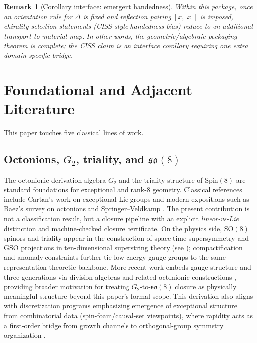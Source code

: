 \documentclass[11pt]{amsart}
\newtheorem{remark}[theorem]{Remark}
\begin{document}
\begin{remark}[Corollary interface: emergent handedness]
Within this package, once an orientation rule for \(\Delta\) is fixed and reflection pairing \([x,|x|]\) is imposed, chirality selection statements (CISS-style handedness bias) reduce to an additional transport-to-material map. In other words, the geometric/algebraic packaging theorem is complete; the CISS claim is an interface corollary requiring one extra domain-specific bridge.
\end{remark}

\section{Foundational and Adjacent Literature}

This paper touches five classical lines of work.

\subsection*{Octonions, \texorpdfstring{$G_2$}{G2}, triality, and \texorpdfstring{$\mathfrak{so}(8)$}{so(8)}}
The octonionic derivation algebra $G_2$ and the triality structure of $\mathrm{Spin}(8)$ are standard foundations for exceptional and rank-8 geometry. Classical references include Cartan's work on exceptional Lie groups and modern expositions such as Baez's survey on octonions \cite{baez2002} and Springer--Veldkamp \cite{springer2000}. The present contribution is not a classification result, but a closure pipeline with an explicit \emph{linear-vs-Lie} distinction and machine-checked closure certificate.
On the physics side, \(\mathrm{SO}(8)\) spinors and triality appear in the construction of space-time supersymmetry and GSO projections in ten-dimensional superstring theory (see \cite{green1987,polchinski1998}); compactification and anomaly constraints further tie low-energy gauge groups to the same representation-theoretic backbone. More recent work embeds gauge structure and three generations via division algebras and related octonionic constructions \cite{furey2018,borsten2014}, providing broader motivation for treating \(G_2\)-to-\(\mathfrak{so}(8)\) closure as physically meaningful structure beyond this paper's formal scope.
This derivation also aligns with discretization programs emphasizing emergence of exceptional structure from combinatorial data (spin-foam/causal-set viewpoints), where rapidity acts as a first-order bridge from growth channels to orthogonal-group symmetry organization \cite{baez2002}.
\end{document}
